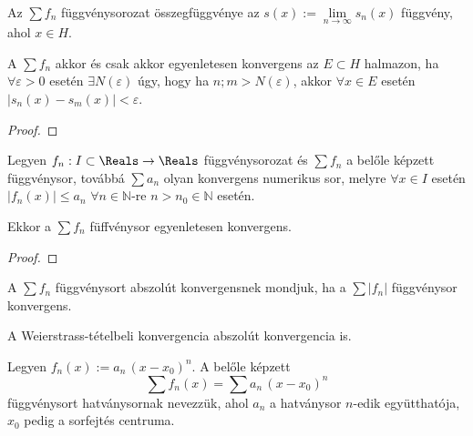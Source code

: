 \begin{definition}
  Az $\sum f_n$ függvénysorozat összegfüggvénye az $s(x) := \lim\limits_{n \to
      \infty} s_n(x)$ függvény, ahol $x \in H$.
\end{definition}

\begin{theorem}
  A $\sum f_n$ akkor és csak akkor egyenletesen konvergens az
  $E \subset H$ halmazon, ha $\forall \varepsilon > 0$ esetén
  $\exists N(\varepsilon)$ úgy, hogy ha $n; m > N(\varepsilon)$,
  akkor $\forall x \in E$ esetén ${|s_n(x) - s_m(x)| < \varepsilon}$.

  \begin{proof}
    \vspace{5em}
  \end{proof}
\end{theorem}

\begin{theorem}
  Legyen $f_n : I \subset \Reals \to \Reals$ függvénysorozat és $\sum f_n$
  a belőle képzett függvénysor, továbbá $\sum a_n$ olyan konvergens numerikus
  sor, melyre $\forall x \in I$ esetén $|f_n(x)| \leq a_n$
  $\forall n \in \mathbb N$-re $n > n_0 \in \mathbb N$ esetén.

  Ekkor a $\sum f_n$ füffvénysor egyenletesen konvergens.

  \begin{proof}
    \vspace{5em}
  \end{proof}
\end{theorem}

\begin{definition}
  A $\sum f_n$ függvénysort abszolút konvergensnek mondjuk, ha a $\sum |f_n|$
  függvénysor konvergens.
\end{definition}

\begin{note}
  A Weierstrass-tételbeli konvergencia abszolút konvergencia is.
\end{note}

\begin{definition}[Hatványsor]
  Legyen $f_n(x) := a_n \, (x - x_0)^n$. A belőle képzett
  $$
    \sum f_n(x) = \sum a_n \, (x - x_0)^n
  $$
  függvénysort hatványsornak nevezzük, ahol $a_n$ a hatványsor $n$-edik
  együtthatója, $x_0$ pedig a sorfejtés centruma.
\end{definition}

